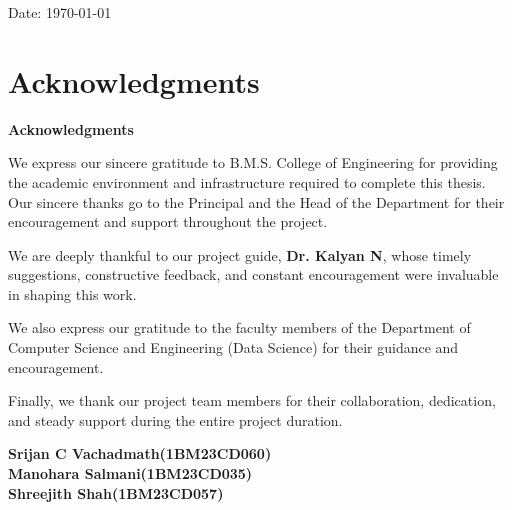 \documentclass[12pt,a4paper]{report}
\newif\iffrontmatterborder
\newcommand{\ApplyBorder}{%
}
\newcommand{\GuideName}{Dr. Kalyan N}
\newcommand{\StudentA}{Srijan C Vachadmath}
\newcommand{\USNA}{1BM23CD060}
\newcommand{\StudentB}{Manohara Salmani}
\newcommand{\USNB}{1BM23CD035}
\newcommand{\StudentC}{Shreejith Shah}
\newcommand{\USNC}{1BM23CD057}
\begin{document}
\vspace{1.0cm}
\noindent Date: \today

\clearpage

\chapter*{Acknowledgments}
\thispagestyle{plain}
\ApplyBorder

\vspace*{1.5cm}
\begin{center}
    {\color{bmsblue}\bfseries\Large Acknowledgments}
\end{center}

\vspace{1cm}
\begin{minipage}{0.9\textwidth}
\setlength{\parindent}{1.2cm}
\setlength{\parskip}{0.75em}
\justifying
We express our sincere gratitude to B.M.S. College of Engineering for providing the academic environment and infrastructure required to complete this thesis. Our sincere thanks go to the Principal and the Head of the Department for their encouragement and support throughout the project.

We are deeply thankful to our project guide, \textbf{\GuideName}, whose timely suggestions, constructive feedback, and constant encouragement were invaluable in shaping this work.

We also express our gratitude to the faculty members of the Department of Computer Science and Engineering (Data Science) for their guidance and encouragement.

Finally, we thank our project team members for their collaboration, dedication, and steady support during the entire project duration.
\end{minipage}

\vfill
\begin{flushright}
\textbf{\StudentA (\USNA)}\\
\textbf{\StudentB (\USNB)}\\
\textbf{\StudentC (\USNC)}
\end{flushright}

\clearpage
\ApplyBorder
\tableofcontents
\clearpage

\ApplyBorder
\listoftables
\clearpage

\ApplyBorder
\listoffigures
\clearpage

\frontmatterborderfalse
\pagestyle{fancy}
\makeatletter
\let\ps@plain\ps@fancy
\makeatother
\end{document}
